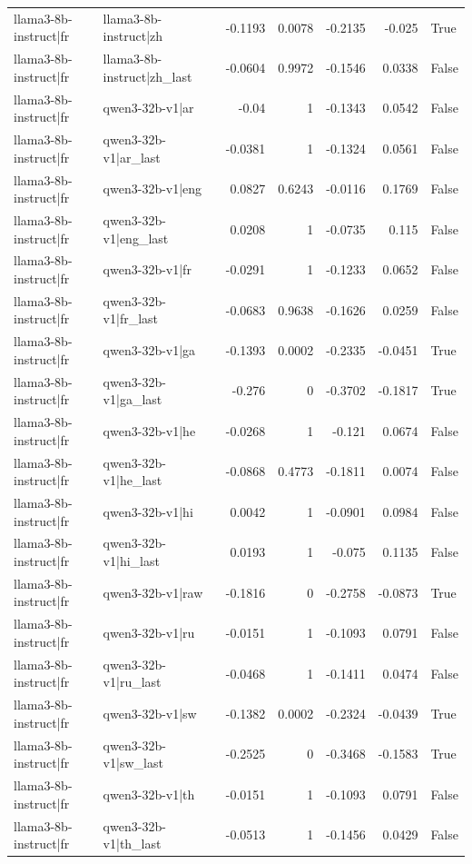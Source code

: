 \begin{table}
\begin{tabular}{l l r r r r l}
llama3-8b-instruct|fr & llama3-8b-instruct|zh & -0.1193 & 0.0078 & -0.2135 & -0.025 & True \\
llama3-8b-instruct|fr & llama3-8b-instruct|zh_last & -0.0604 & 0.9972 & -0.1546 & 0.0338 & False \\
llama3-8b-instruct|fr & qwen3-32b-v1|ar & -0.04 & 1 & -0.1343 & 0.0542 & False \\
llama3-8b-instruct|fr & qwen3-32b-v1|ar_last & -0.0381 & 1 & -0.1324 & 0.0561 & False \\
llama3-8b-instruct|fr & qwen3-32b-v1|eng & 0.0827 & 0.6243 & -0.0116 & 0.1769 & False \\
llama3-8b-instruct|fr & qwen3-32b-v1|eng_last & 0.0208 & 1 & -0.0735 & 0.115 & False \\
llama3-8b-instruct|fr & qwen3-32b-v1|fr & -0.0291 & 1 & -0.1233 & 0.0652 & False \\
llama3-8b-instruct|fr & qwen3-32b-v1|fr_last & -0.0683 & 0.9638 & -0.1626 & 0.0259 & False \\
llama3-8b-instruct|fr & qwen3-32b-v1|ga & -0.1393 & 0.0002 & -0.2335 & -0.0451 & True \\
llama3-8b-instruct|fr & qwen3-32b-v1|ga_last & -0.276 & 0 & -0.3702 & -0.1817 & True \\
llama3-8b-instruct|fr & qwen3-32b-v1|he & -0.0268 & 1 & -0.121 & 0.0674 & False \\
llama3-8b-instruct|fr & qwen3-32b-v1|he_last & -0.0868 & 0.4773 & -0.1811 & 0.0074 & False \\
llama3-8b-instruct|fr & qwen3-32b-v1|hi & 0.0042 & 1 & -0.0901 & 0.0984 & False \\
llama3-8b-instruct|fr & qwen3-32b-v1|hi_last & 0.0193 & 1 & -0.075 & 0.1135 & False \\
llama3-8b-instruct|fr & qwen3-32b-v1|raw & -0.1816 & 0 & -0.2758 & -0.0873 & True \\
llama3-8b-instruct|fr & qwen3-32b-v1|ru & -0.0151 & 1 & -0.1093 & 0.0791 & False \\
llama3-8b-instruct|fr & qwen3-32b-v1|ru_last & -0.0468 & 1 & -0.1411 & 0.0474 & False \\
llama3-8b-instruct|fr & qwen3-32b-v1|sw & -0.1382 & 0.0002 & -0.2324 & -0.0439 & True \\
llama3-8b-instruct|fr & qwen3-32b-v1|sw_last & -0.2525 & 0 & -0.3468 & -0.1583 & True \\
llama3-8b-instruct|fr & qwen3-32b-v1|th & -0.0151 & 1 & -0.1093 & 0.0791 & False \\
llama3-8b-instruct|fr & qwen3-32b-v1|th_last & -0.0513 & 1 & -0.1456 & 0.0429 & False \\

\end{tabular}
\end{table}
